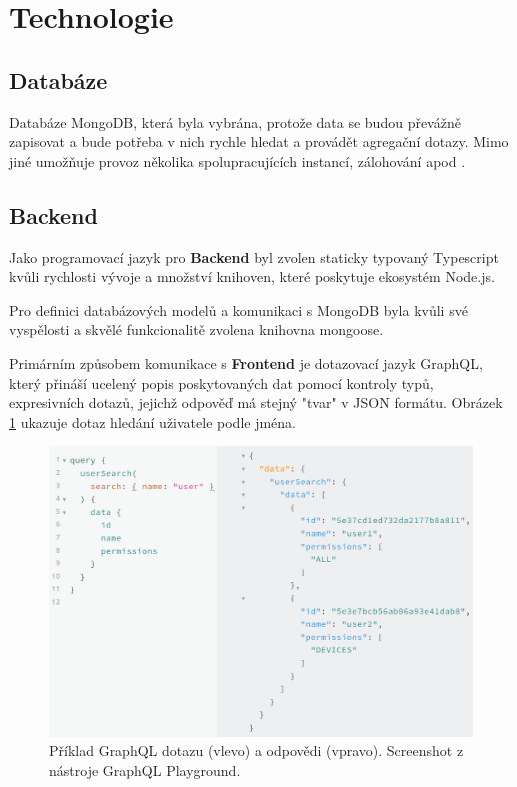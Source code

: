 \section{Technologie}

\subsection{Databáze}

Databáze MongoDB, která byla vybrána, protože data se budou převážně zapisovat a bude potřeba v nich rychle hledat a provádět agregační dotazy.
Mimo jiné umožňuje provoz několika spolupracujících instancí, zálohování apod \citep[viz][]{MongoDB}.

\subsection{Backend} \label{backend}

Jako programovací jazyk pro \textbf{Backend} byl zvolen staticky typovaný Typescript kvůli rychlosti vývoje
a množství knihoven, které poskytuje ekosystém Node.js.

Pro definici databázových modelů a komunikaci s MongoDB byla kvůli své vyspělosti a skvělé funkcionalitě zvolena
knihovna mongoose.

Primárním způsobem komunikace s \textbf{Frontend}
je dotazovací jazyk GraphQL, který přináší ucelený popis poskytovaných dat pomocí kontroly typů,
expresivních dotazů, jejichž odpověď má stejný "tvar" v JSON formátu.
Obrázek \ref{fig:graphql_example} ukazuje dotaz hledání uživatele podle jména.

\begin{figure} \centering
\includegraphics[width=145mm]{../img/graphql_example.png}
\caption{Příklad GraphQL dotazu (vlevo) a odpovědi (vpravo). Screenshot z nástroje GraphQL Playground.}
\label{fig:graphql_example}
\end{figure}

